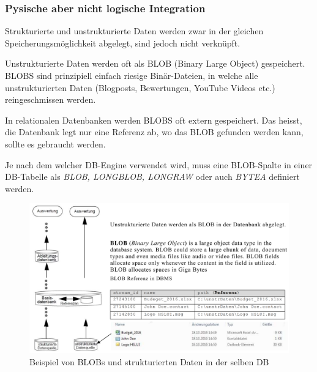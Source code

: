 \documentclass[a4paper, 11pt, nofootinbib]{article}
\begin{document}
\subsubsection{Pysische aber nicht logische Integration}
Strukturierte und unstrukturierte Daten werden zwar in der gleichen Speicherungsmöglichkeit abgelegt, sind jedoch nicht verknüpft.

Unstrukturierte Daten werden oft als BLOB (Binary Large Object) gespeichert. BLOBS sind prinzipiell einfach riesige Binär-Dateien, in welche alle unstrukturierten Daten (Blogposts, Bewertungen, YouTube Videos etc.) reingeschmissen werden.

In relationalen Datenbanken werden BLOBS oft extern gespeichert. Das heisst, die Datenbank legt nur eine Referenz ab, wo das BLOB gefunden werden kann, sollte es gebraucht werden.

Je nach dem welcher DB-Engine verwendet wird, muss eine BLOB-Spalte in einer DB-Tabelle als \textit{BLOB, LONGBLOB, LONGRAW} oder auch \textit{BYTEA} definiert werden.

\begin{figure}[htb]
	\centering
	\includegraphics[keepaspectratio=true,height=15\baselineskip]{blob}
	\caption{Beispiel von BLOBs und strukturierten Daten in der selben DB}
	\label{fig:blob}
\end{figure}

\newpage
\end{document}
